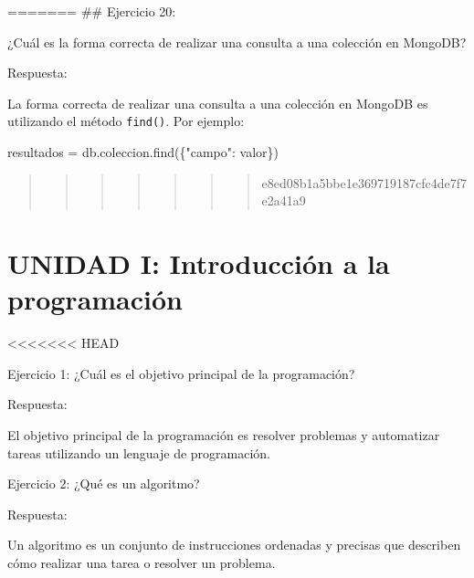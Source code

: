 \documentclass[
  a4paper,
  onepage,
  openany]{scrreprt}
\newenvironment{Shaded}{\begin{snugshade}}{\end{snugshade}}
\newcommand{\NormalTok}[1]{\textcolor[rgb]{0.00,0.23,0.31}{#1}}
\newcommand{\OperatorTok}[1]{\textcolor[rgb]{0.37,0.37,0.37}{#1}}
\newcommand{\StringTok}[1]{\textcolor[rgb]{0.13,0.47,0.30}{#1}}
\begin{document}
======= \#\# Ejercicio 20:

¿Cuál es la forma correcta de realizar una consulta a una colección en
MongoDB?

Respuesta:

La forma correcta de realizar una consulta a una colección en MongoDB es
utilizando el método \texttt{find()}. Por ejemplo:

\begin{Shaded}
\begin{Highlighting}[]
\NormalTok{resultados }\OperatorTok{=}\NormalTok{ db.coleccion.find(\{}\StringTok{"campo"}\NormalTok{: valor\})}
\end{Highlighting}
\end{Shaded}

\begin{quote}
\begin{quote}
\begin{quote}
\begin{quote}
\begin{quote}
\begin{quote}
\begin{quote}
e8ed08b1a5bbe1e369719187cfc4de7f7e2a41a9
\end{quote}
\end{quote}
\end{quote}
\end{quote}
\end{quote}
\end{quote}
\end{quote}

\hypertarget{unidad-i-introducciuxf3n-a-la-programaciuxf3n}{%
\chapter{UNIDAD I: Introducción a la
programación}\label{unidad-i-introducciuxf3n-a-la-programaciuxf3n}}

\textless\textless\textless\textless\textless\textless\textless{} HEAD

Ejercicio 1: ¿Cuál es el objetivo principal de la programación?

Respuesta:

El objetivo principal de la programación es resolver problemas y
automatizar tareas utilizando un lenguaje de programación.

Ejercicio 2: ¿Qué es un algoritmo?

Respuesta:

Un algoritmo es un conjunto de instrucciones ordenadas y precisas que
describen cómo realizar una tarea o resolver un problema.
\end{document}
